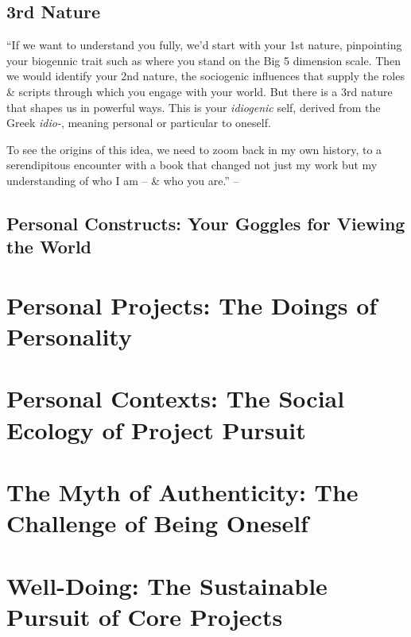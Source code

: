 \documentclass{article}
\numberwithin{equation}{section}
\begin{document}
\subsection{3rd Nature}
``If we want to understand you fully, we'd start with your 1st nature, pinpointing your biogennic trait such as where you stand on the Big 5 dimension scale. Then we would identify your 2nd nature, the sociogenic influences that supply the roles \& scripts through which you engage with your world. But there is a 3rd nature that shapes us in powerful ways. This is your \textit{idiogenic} self, derived from the Greek \textit{idio-}, meaning personal or particular to oneself.

To see the origins of this idea, we need to zoom back in my own history, to a serendipitous encounter with a book that changed not just my work but my understanding of who I am -- \& who you are.'' -- \cite[p. 23]{Little2017}

\subsection{Personal Constructs: Your Goggles for Viewing the World}


\section{Personal Projects: The Doings of Personality}



\section{Personal Contexts: The Social Ecology of Project Pursuit}


\section{The Myth of Authenticity: The Challenge of Being Oneself}


\section{Well-Doing: The Sustainable Pursuit of Core Projects}


\printbibliography[heading=bibintoc]
	
\end{document}
